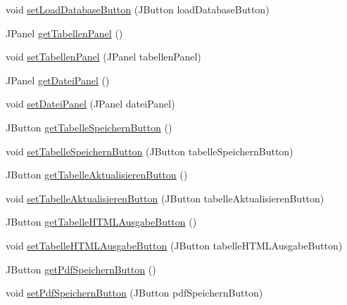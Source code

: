 \begin{DoxyCompactItemize}
\item 
void \hyperlink{classde_1_1turnierverwaltung_1_1view_1_1_navi_view_a9f57c55790baa3de65ed2f88de02f9d1}{set\+Load\+Database\+Button} (J\+Button load\+Database\+Button)
\item 
J\+Panel \hyperlink{classde_1_1turnierverwaltung_1_1view_1_1_navi_view_a92eba4c5d7c8c03fae8273f4346d2a95}{get\+Tabellen\+Panel} ()
\item 
void \hyperlink{classde_1_1turnierverwaltung_1_1view_1_1_navi_view_ab97ddce2f19320b47724cbafadafc21f}{set\+Tabellen\+Panel} (J\+Panel tabellen\+Panel)
\item 
J\+Panel \hyperlink{classde_1_1turnierverwaltung_1_1view_1_1_navi_view_a235fccb52ba50cd0209da042fc0791fe}{get\+Datei\+Panel} ()
\item 
void \hyperlink{classde_1_1turnierverwaltung_1_1view_1_1_navi_view_af0e3dc5d6b1883931f5359d6ef914442}{set\+Datei\+Panel} (J\+Panel datei\+Panel)
\item 
J\+Button \hyperlink{classde_1_1turnierverwaltung_1_1view_1_1_navi_view_a33705cc21581a89092bbbfd5e5b0ef23}{get\+Tabelle\+Speichern\+Button} ()
\item 
void \hyperlink{classde_1_1turnierverwaltung_1_1view_1_1_navi_view_a673bbb18ea85812b9f73f61efb12aea6}{set\+Tabelle\+Speichern\+Button} (J\+Button tabelle\+Speichern\+Button)
\item 
J\+Button \hyperlink{classde_1_1turnierverwaltung_1_1view_1_1_navi_view_a9da1d6d0ddc03735bdd6e53966a77277}{get\+Tabelle\+Aktualisieren\+Button} ()
\item 
void \hyperlink{classde_1_1turnierverwaltung_1_1view_1_1_navi_view_a49504377cb1fd9bd109f56dafd82f7f4}{set\+Tabelle\+Aktualisieren\+Button} (J\+Button tabelle\+Aktualisieren\+Button)
\item 
J\+Button \hyperlink{classde_1_1turnierverwaltung_1_1view_1_1_navi_view_a0e619992634ead23425ba2772f7b520b}{get\+Tabelle\+H\+T\+M\+L\+Ausgabe\+Button} ()
\item 
void \hyperlink{classde_1_1turnierverwaltung_1_1view_1_1_navi_view_a845c4293fad0399cd74daaba01e9e09c}{set\+Tabelle\+H\+T\+M\+L\+Ausgabe\+Button} (J\+Button tabelle\+H\+T\+M\+L\+Ausgabe\+Button)
\item 
J\+Button \hyperlink{classde_1_1turnierverwaltung_1_1view_1_1_navi_view_a75dc0b9a99526518ab25aa4b461b1f9d}{get\+Pdf\+Speichern\+Button} ()
\item 
void \hyperlink{classde_1_1turnierverwaltung_1_1view_1_1_navi_view_a2b883d85472d49df44f7e795827e350a}{set\+Pdf\+Speichern\+Button} (J\+Button pdf\+Speichern\+Button)

\end{DoxyCompactItemize}
